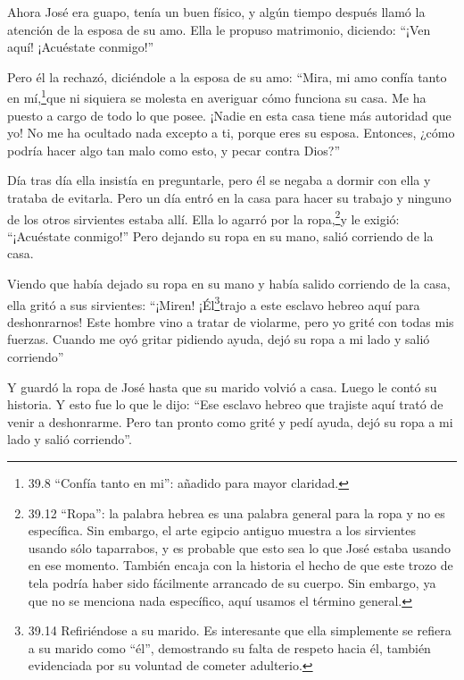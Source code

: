 Ahora José era guapo, tenía un buen físico,  y algún tiempo
después llamó la atención de la esposa de su amo. Ella le propuso
matrimonio, diciendo: ``¡Ven aquí! ¡Acuéstate conmigo!''

 Pero él la rechazó, diciéndole a la esposa de su amo:
``Mira, mi amo confía tanto en mí,\footnote{39.8 ``Confía tanto en mi'':
  añadido para mayor claridad.}que ni siquiera se molesta en averiguar
cómo funciona su casa. Me ha puesto a cargo de todo lo que posee.
 ¡Nadie en esta casa tiene más autoridad que yo! No me ha
ocultado nada excepto a ti, porque eres su esposa. Entonces, ¿cómo
podría hacer algo tan malo como esto, y pecar contra Dios?''

 Día tras día ella insistía en preguntarle, pero él se
negaba a dormir con ella y trataba de evitarla.  Pero un
día entró en la casa para hacer su trabajo y ninguno de los otros
sirvientes estaba allí.  Ella lo agarró por la
ropa,\footnote{39.12 ``Ropa'': la palabra hebrea es una palabra general
  para la ropa y no es específica. Sin embargo, el arte egipcio antiguo
  muestra a los sirvientes usando sólo taparrabos, y es probable que
  esto sea lo que José estaba usando en ese momento. También encaja con
  la historia el hecho de que este trozo de tela podría haber sido
  fácilmente arrancado de su cuerpo. Sin embargo, ya que no se menciona
  nada específico, aquí usamos el término general.}y le exigió:
``¡Acuéstate conmigo!'' Pero dejando su ropa en su mano, salió corriendo
de la casa.

 Viendo que había dejado su ropa en su mano y había salido
corriendo de la casa,  ella gritó a sus sirvientes:
``¡Miren! ¡Él\footnote{39.14 Refiriéndose a su marido. Es interesante
  que ella simplemente se refiera a su marido como ``él'', demostrando
  su falta de respeto hacia él, también evidenciada por su voluntad de
  cometer adulterio.}trajo a este esclavo hebreo aquí para deshonrarnos!
Este hombre vino a tratar de violarme, pero yo grité con todas mis
fuerzas.  Cuando me oyó gritar pidiendo ayuda, dejó su ropa
a mi lado y salió corriendo''

 Y guardó la ropa de José hasta que su marido volvió a
casa.  Luego le contó su historia. Y esto fue lo que le
dijo: ``Ese esclavo hebreo que trajiste aquí trató de venir a
deshonrarme.  Pero tan pronto como grité y pedí ayuda, dejó
su ropa a mi lado y salió corriendo''.

